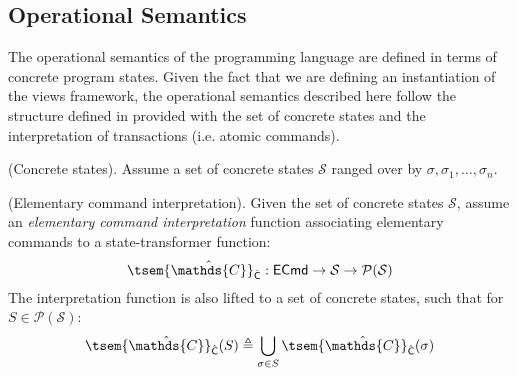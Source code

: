\subsection{Operational Semantics}

The operational semantics of the programming language are defined in terms of concrete program states. Given the fact that we are defining an instantiation of the views framework, the operational semantics described here follow the structure defined in \cite{views} provided with the set of concrete states and the interpretation of transactions (i.e. atomic commands).

\begin{param}
	(Concrete states).
	Assume a set of concrete states $\mathcal{S}$ ranged over by $\sigma, \sigma_1, \ldots, \sigma_n$.
\end{param}

\begin{param}
	\label{param:ecmdInt}
	(Elementary command interpretation).
	Given the set of concrete states $\mathcal{S}$, assume an \emph{elementary command interpretation} function associating elementary commands to a state-transformer function:
	\[
		\tsem{\hat{\mathds{C}}}_{\hat{\mathsf{C}}} : \mathsf{ECmd} \rightarrow \mathcal{S} \rightarrow \mathcal{P}(\mathcal{S})
	\]
	The interpretation function is also lifted to a set of concrete states, such that for $S \in \mathcal{P}(\mathcal{S})$:
	\[
		\tsem{\hat{\mathds{C}}}_{\hat{\mathsf{C}}}(S) \triangleq \bigcup_{\sigma \in S} \tsem{\hat{\mathds{C}}}_{\hat{\mathsf{C}}}(\sigma)
	\]
\end{param}

